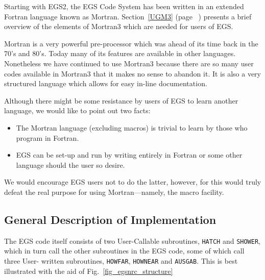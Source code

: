 Starting with EGS2, the EGS Code System has been written in an extended
Fortran language known as Mortran\cite{Co83}. Section~\ref{UGM3} (page
~\pageref{UGM3}) presents a
brief overview of the elements of Mortran3 which are needed for users of
EGS.

Mortran is a very powerful pre-processor which was ahead of its time back
in the 70's and 80's.  Today many of its features are available in other
languages. Nonetheless we have continued to use Mortran3 because there
are so many user codes available in Mortran3 that it makes no sense to
abandon it.  It is also a very structured language which allows for easy
in-line documentation.


      Although there might be some resistance by users of EGS
 to learn another language, we would like to point out two facts:
\begin{itemize}
      \item   The Mortran language (excluding macros) is trivial
            to learn by those who program in Fortran.

      \item   EGS can be set-up and run by writing entirely in
            Fortran or some other language should the user so desire.
\end{itemize}

 We would encourage EGS users not to do the latter, however, for this
would truly defeat the real purpose for using Mortran---namely, the
macro facility.


\subsection{ General Description of Implementation}

The EGS code itself consists of two User-Callable subroutines, {\tt HATCH}
and {\tt SHOWER}, which in turn call the other subroutines in the EGS
code, some of which call three User- written subroutines, {\tt HOWFAR},
{\tt HOWNEAR} and {\tt AUSGAB}.  This is best illustrated with the aid
of Fig.~\ref{fig_egsnrc_structure}

